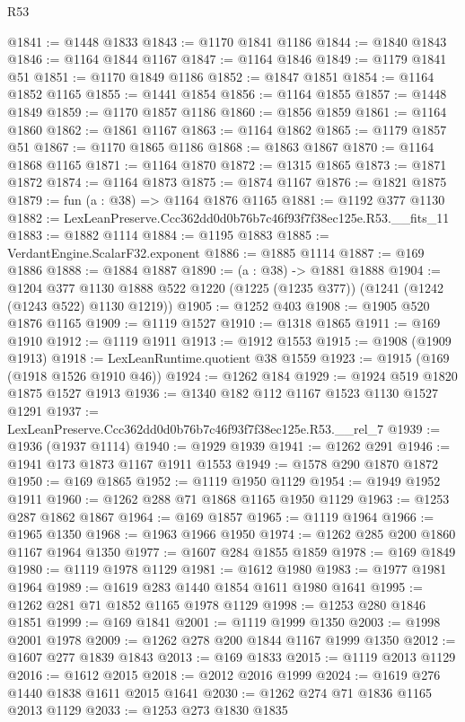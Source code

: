 \begin{lexlean}{R53}
\begin{coremodule}
@1841 := @1448 @1833
@1843 := @1170 @1841 @1186
@1844 := @1840 @1843
@1846 := @1164 @1844 @1167
@1847 := @1164 @1846
@1849 := @1179 @1841 @51
@1851 := @1170 @1849 @1186
@1852 := @1847 @1851
@1854 := @1164 @1852 @1165
@1855 := @1441 @1854
@1856 := @1164 @1855
@1857 := @1448 @1849
@1859 := @1170 @1857 @1186
@1860 := @1856 @1859
@1861 := @1164 @1860
@1862 := @1861 @1167
@1863 := @1164 @1862
@1865 := @1179 @1857 @51
@1867 := @1170 @1865 @1186
@1868 := @1863 @1867
@1870 := @1164 @1868 @1165
@1871 := @1164 @1870
@1872 := @1315 @1865
@1873 := @1871 @1872
@1874 := @1164 @1873
@1875 := @1874 @1167
@1876 := @1821 @1875
@1879 := fun (a : @38) => @1164 @1876 @1165
@1881 := @1192 @377 @1130
@1882 := LexLeanPreserve.Ccc362dd0d0b76b7c46f93f7f38ec125e.R53.__fits_11
@1883 := @1882 @1114
@1884 := @1195 @1883
@1885 := VerdantEngine.ScalarF32.exponent
@1886 := @1885 @1114
@1887 := @169 @1886
@1888 := @1884 @1887
@1890 := (a : @38) -> @1881 @1888
@1904 := @1204
    @377
    @1130
    @1888
    @522
    @1220
    (@1225 (@1235 @377))
    (@1241 (@1242 (@1243 @522) @1130 @1219))
@1905 := @1252 @403
@1908 := @1905 @520 @1876 @1165
@1909 := @1119 @1527
@1910 := @1318 @1865
@1911 := @169 @1910
@1912 := @1119 @1911
@1913 := @1912 @1553
@1915 := @1908 (@1909 @1913)
@1918 := LexLeanRuntime.quotient @38 @1559
@1923 := @1915 (@169 (@1918 @1526 @1910 @46))
@1924 := @1262 @184
@1929 := @1924 @519 @1820 @1875 @1527 @1913
@1936 := @1340 @182 @112 @1167 @1523 @1130 @1527 @1291
@1937 := LexLeanPreserve.Ccc362dd0d0b76b7c46f93f7f38ec125e.R53.__rel_7
@1939 := @1936 (@1937 @1114)
@1940 := @1929 @1939
@1941 := @1262 @291
@1946 := @1941 @173 @1873 @1167 @1911 @1553
@1949 := @1578 @290 @1870 @1872
@1950 := @169 @1865
@1952 := @1119 @1950 @1129
@1954 := @1949 @1952 @1911
@1960 := @1262 @288 @71 @1868 @1165 @1950 @1129
@1963 := @1253 @287 @1862 @1867
@1964 := @169 @1857
@1965 := @1119 @1964
@1966 := @1965 @1350
@1968 := @1963 @1966 @1950
@1974 := @1262 @285 @200 @1860 @1167 @1964 @1350
@1977 := @1607 @284 @1855 @1859
@1978 := @169 @1849
@1980 := @1119 @1978 @1129
@1981 := @1612 @1980
@1983 := @1977 @1981 @1964
@1989 := @1619 @283 @1440 @1854 @1611 @1980 @1641
@1995 := @1262 @281 @71 @1852 @1165 @1978 @1129
@1998 := @1253 @280 @1846 @1851
@1999 := @169 @1841
@2001 := @1119 @1999 @1350
@2003 := @1998 @2001 @1978
@2009 := @1262 @278 @200 @1844 @1167 @1999 @1350
@2012 := @1607 @277 @1839 @1843
@2013 := @169 @1833
@2015 := @1119 @2013 @1129
@2016 := @1612 @2015
@2018 := @2012 @2016 @1999
@2024 := @1619 @276 @1440 @1838 @1611 @2015 @1641
@2030 := @1262 @274 @71 @1836 @1165 @2013 @1129
@2033 := @1253 @273 @1830 @1835

\end{coremodule}
\end{lexlean}
